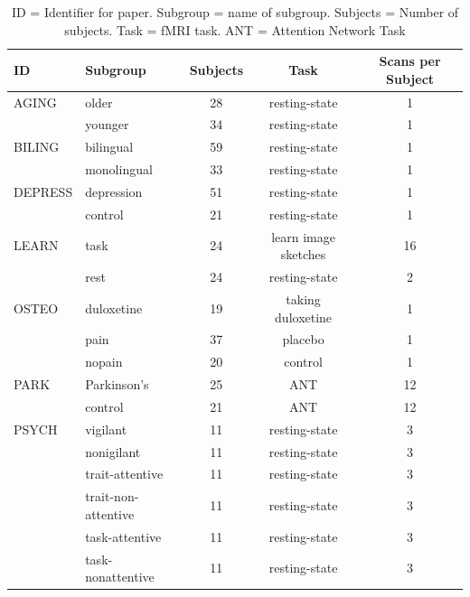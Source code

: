 \documentclass[12pt]{spieman}  %
\begin{document}
\begin{spacing}{2}
\begin{table}[h!]
\caption{
    ID = Identifier for paper. Subgroup = name of subgroup. Subjects = Number of subjects.
    Task = fMRI task. ANT = Attention Network Task \cite{fanActivationAttentionalNetworks2005}
}
\label{table:2}
\small
\centering
\begin{tabular}{ l l c c c }
\hline
\textbf{ID}  & \textbf{Subgroup}  & \textbf{Subjects}  & \textbf{Task} & \textbf{Scans per Subject} \\
\hline
AGING   &  older             & 28      & resting-state         & 1 \\
        &  younger           & 34      & resting-state         & 1 \\
\hline
BILING  &  bilingual          & 59      & resting-state        & 1 \\
        &  monolingual        & 33      & resting-state        & 1 \\
\hline
DEPRESS &  depression         & 51      & resting-state        & 1 \\
        &  control            & 21      & resting-state        & 1 \\
\hline
LEARN   &  task              & 24      & learn image sketches  & 16 \\
        &  rest              & 24      & resting-state         & 2 \\
\hline
OSTEO   &  duloxetine        & 19      & taking duloxetine     & 1 \\
        &  pain              & 37      & placebo               & 1 \\
        &  nopain            & 20      & control               & 1 \\
\hline
PARK    &  Parkinson's       & 25      & ANT                   & 12 \\
        &  control           & 21      & ANT                   & 12 \\
\hline
PSYCH   &  vigilant           & 11     & resting-state        & 3 \\
        &  nonigilant         & 11     & resting-state        & 3 \\
        &  trait-attentive     & 11    & resting-state        & 3 \\
        &  trait-non-attentive & 11    & resting-state        & 3 \\
        &  task-attentive     & 11     & resting-state        & 3 \\
        &  task-nonattentive  & 11     & resting-state        & 3 \\
\hline
\end{tabular}
\end{table}


\end{spacing}
\end{document}
